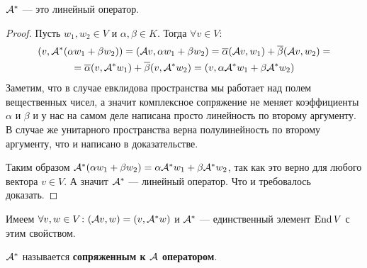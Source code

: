 \documentclass[../main.tex]{subfiles}
\begin{document}
\begin{theorem-non}
  $\mathcal{A}^{*}$ --- это линейный оператор.
\end{theorem-non}
\begin{proof}
    Пусть $w_1, w_2 \in V$ и $\alpha, \beta \in K$. Тогда $\forall v \in V$:
    \begin{equation*}
      \begin{gathered}
        (v, \mathcal{A}^{*}(\alpha w_1 + \beta w_2)) = (\mathcal{A} v, \alpha w_1 + \beta w_2) = \overline{\alpha}(\mathcal{A} v, w_1) + \overline{\beta}(\mathcal{A} v, w_2)
        = \\ =
        \overline{\alpha}(v, \mathcal{A}^{*} w_1) + \overline{\beta}(v, \mathcal{A}^{*} w_2) = (v, \alpha \mathcal{A}^{*} w_1 + \beta \mathcal{A}^{*} w_2)
      \end{gathered}
    \end{equation*}
    Заметим, что в случае евклидова пространства мы работает над полем вещественных чисел, а значит комплексное сопряжение не меняет коэффициенты $\alpha$ и $\beta$ и у нас на самом деле написана просто линейность по второму аргументу. В случае же унитарного пространства верна полулинейность по второму аргументу, что и написано в доказательстве.

    Таким образом $\mathcal{A}^{*}(\alpha w_1 + \beta w_2) = \alpha \mathcal{A}^{*} w_1 + \beta \mathcal{A}^{*} w_2$, так как это верно для любого вектора $v \in V$. А значит $\mathcal{A}^{*}$ --- линейный оператор. Что и требовалось доказать.
\end{proof}

\begin{remark}
  Имеем $\forall v, w \in V\colon (\mathcal{A} v, w) = (v, \mathcal{A}^{*} w)$ и $\mathcal{A}^{*}$ --- единственный элемент $\operatorname{End} V$ с этим свойством.
\end{remark}

\begin{definition}
  $\mathcal{A}^{*}$ называется \textbf{сопряженным к $\mathcal{A}$ оператором}.
\end{definition}
\end{document}
